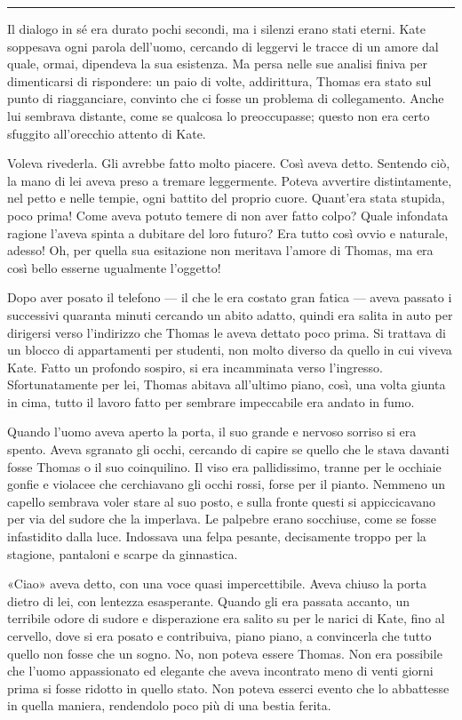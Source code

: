 \documentclass[a4paper,oneside,10pt]{memoir}
\begin{document}
\plainbreak{1}

Il dialogo in sé era durato pochi secondi, ma i silenzi erano stati eterni. Kate soppesava ogni parola dell'uomo,
cercando di leggervi le tracce di un amore dal quale, ormai, dipendeva la sua esistenza. Ma persa nelle sue analisi
finiva per dimenticarsi di rispondere: un paio di volte, addirittura, Thomas era stato sul punto di riagganciare,
convinto che ci fosse un problema di collegamento. Anche lui sembrava distante, come se qualcosa lo preoccupasse; questo
non era certo sfuggito all'orecchio attento di Kate.

Voleva rivederla. Gli avrebbe fatto molto piacere. Così aveva detto. Sentendo ciò, la mano di lei aveva preso a tremare
leggermente. Poteva avvertire distintamente, nel petto e nelle tempie, ogni battito del proprio cuore. Quant'era stata
stupida, poco prima! Come aveva potuto temere di non aver fatto colpo? Quale infondata ragione l'aveva spinta a dubitare
del loro futuro? Era tutto così ovvio e naturale, adesso! Oh, per quella sua esitazione non meritava l'amore di Thomas,
ma era così bello esserne ugualmente l'oggetto!

Dopo aver posato il telefono --- il che le era costato gran fatica --- aveva passato i successivi quaranta minuti
cercando un abito adatto, quindi era salita in auto per dirigersi verso l'indirizzo che Thomas le aveva dettato poco
prima. Si trattava di un blocco di appartamenti per studenti, non molto diverso da quello in cui viveva Kate. Fatto un
profondo sospiro, si era incamminata verso l'ingresso. Sfortunatamente per lei, Thomas abitava all'ultimo piano, così,
una volta giunta in cima, tutto il lavoro fatto per sembrare impeccabile era andato in fumo.

Quando l'uomo aveva aperto la porta, il suo grande e nervoso sorriso si era spento. Aveva sgranato gli occhi, cercando
di capire se quello che le stava davanti fosse Thomas o il suo coinquilino. Il viso era pallidissimo, tranne per le
occhiaie gonfie e violacee che cerchiavano gli occhi rossi, forse per il pianto. Nemmeno un capello sembrava voler stare
al suo posto, e sulla fronte questi si appiccicavano per via del sudore che la imperlava. Le palpebre erano socchiuse,
come se fosse infastidito dalla luce. Indossava una felpa pesante, decisamente troppo per la stagione, pantaloni e
scarpe da ginnastica.

«Ciao» aveva detto, con una voce quasi impercettibile. Aveva chiuso la porta dietro di lei, con lentezza esasperante.
Quando gli era passata accanto, un terribile odore di sudore e disperazione era salito su per le narici di Kate, fino al
cervello, dove si era posato e contribuiva, piano piano, a convincerla che tutto quello non fosse che un sogno. No, non
poteva essere Thomas. Non era possibile che l'uomo appassionato ed elegante che aveva incontrato meno di venti giorni
prima si fosse ridotto in quello stato. Non poteva esserci evento che lo abbattesse in quella maniera, rendendolo poco
più di una bestia ferita.
\end{document}

